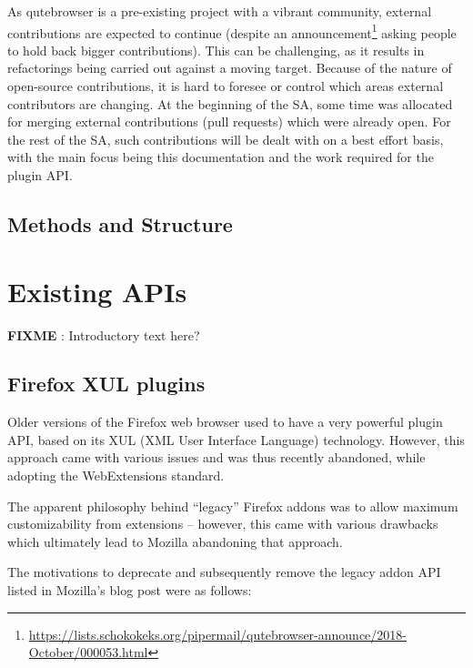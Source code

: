 \documentclass[a4paper,parskip=full]{scrreprt}
\newcommand{\fixme}[1]{\textbf{FIXME} \emph{#1}}
\begin{document}
As qutebrowser is a pre-existing project with a vibrant community, external
contributions are expected to continue (despite an
announcement\footnote{\url{https://lists.schokokeks.org/pipermail/qutebrowser-announce/2018-October/000053.html}}
asking people to hold back bigger contributions). This can be challenging,
as it results in refactorings being carried out against a moving target. Because
of the nature of open-source contributions,
it is hard to foresee or control which areas external contributors are changing.
At the beginning of the SA, some time was allocated for merging external
contributions (pull requests) which were already open. For the rest of the SA,
such contributions will be dealt with on a best effort basis, with the main
focus being this documentation and the work required for the plugin API.

\section{Methods and Structure}



\chapter{Existing APIs}
\label{unsuitable}

\fixme{}: Introductory text here?

\section{Firefox XUL plugins}

Older versions of the Firefox web browser used to have a very powerful plugin
API, based on its XUL (XML User Interface Language) technology. However, this
approach came with various issues and was thus recently abandoned, while
adopting the WebExtensions standard.

The apparent philosophy behind ``legacy'' Firefox addons was to allow maximum
customizability from extensions -- however, this came with various drawbacks
which ultimately lead to Mozilla abandoning that approach.

The motivations to deprecate and subsequently remove the legacy addon API listed
in Mozilla's blog post \citep{mozilla-webext} were as follows:
\end{document}
